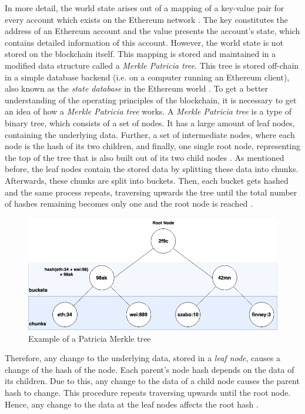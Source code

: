 In more detail, the world state arises out of a mapping of a key-value pair for every account which exists 
on the Ethereum network . 
The key constitutes the address of an Ethereum account and the value presents 
the account's state, which contains detailed information of this account. 
However, the world state is not stored on the blockchain itself. 
This mapping is stored and maintained in a modified data structure 
called a \textit{Merkle Patricia tree}. This tree is stored off-chain 
in a simple database backend (i.e. on a computer running an Ethereum client), 
also known as the \textit{state database} in the Ethereum world . 
To get a better understanding of the operating principles of the blockchain, 
it is necessary to get an idea of how a \textit{Merkle Patricia tree} works. 
A \textit{Merkle Patricia tree} is a type of binary tree, which consists 
of a set of nodes. It has a large amount of 
leaf nodes, containing the underlying data. 
Further, a set of intermediate nodes, where each node is 
the hash of its two children, and finally, one single root node, 
representing the top of the tree that is also built out of its 
two child nodes  .
As mentioned before, the leaf nodes contain the stored data 
by splitting these data into chunks. Afterwards, these chunks are split into buckets. 
Then, each bucket gets hashed and the same process repeats, traversing 
upwards the tree until the total number of hashes remaining becomes 
only one and the root node is reached . 

\begin{figure}[htbp]
	\centering
	\includegraphics[width=.75\linewidth]{./figures/merkle_tree.png}
	\caption{Example of a Patricia Merkle tree}
	\label{figure:merkle_tree}
\end{figure}

Therefore, any change to the underlying data, stored in a \textit{leaf node}, causes a change
of the hash of the node. Each parent's node hash depends on the data of its children. 
Due to this, any change to the data of a child node causes the parent hash to change. 
This procedure repeats traversing upwards until the root node. 
Hence, any change to the data at the leaf nodes affects the root hash . 

